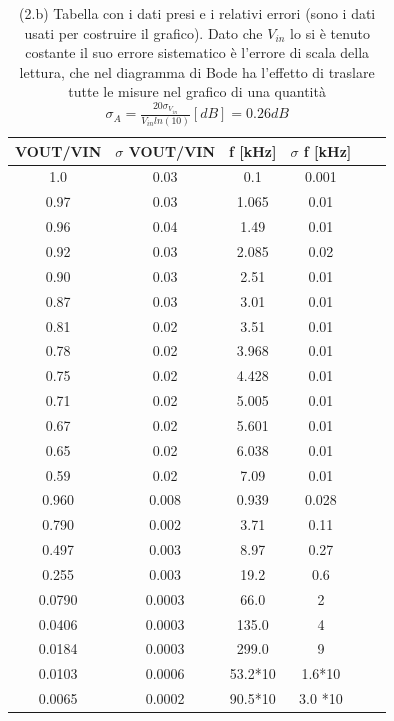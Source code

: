 \documentclass[10pt,a4paper]{article}
\begin{document}
\begin{table}[h]
	\centering
	\begin{tabular}{|c|c|c|c|c|c|}
		\hline 
		 VOUT/VIN & $\sigma$ VOUT/VIN  &f [kHz] & $\sigma$ f [kHz]\\
		\hline 
	1.0 & 0.03 & 0.1 & 0.001\\
	0.97 & 0.03 & 1.065 & 0.01\\
	0.96 & 0.04 & 1.49 & 0.01\\
	0.92 & 0.03 & 2.085 & 0.02\\
	0.90 & 0.03 & 2.51 & 0.01\\
	0.87 & 0.03 & 3.01 & 0.01\\
	0.81 & 0.02 & 3.51 & 0.01\\
	0.78 & 0.02 & 3.968 & 0.01\\
	0.75 & 0.02 & 4.428 & 0.01\\
	0.71 & 0.02 & 5.005 & 0.01\\
	0.67 & 0.02 & 5.601 & 0.01\\
	0.65 & 0.02 & 6.038 & 0.01\\
	0.59 & 0.02 & 7.09 & 0.01\\
	0.960 & 0.008 & 0.939 & 0.028\\
	0.790 & 0.002 & 3.71 & 0.11\\
	0.497 & 0.003 & 8.97 & 0.27\\
	0.255 & 0.003 & 19.2 & 0.6\\
	0.0790 & 0.0003 & 66.0 & 2\\
	0.0406 & 0.0003 & 135.0 & 4\\
	0.0184 & 0.0003 & 299.0 & 9\\
	0.0103 & 0.0006 & 53.2*10 & 1.6*10\\
	0.0065 & 0.0002 & 90.5*10 & 3.0 *10\\
		\hline 
	\end{tabular} 
	\caption{(2.b) Tabella con i dati presi e i relativi errori (sono i dati usati per costruire il grafico). Dato che $V_{in}$ lo si è tenuto costante il suo errore sistematico è l'errore di scala della lettura, che nel diagramma di Bode ha l'effetto di traslare tutte le misure nel grafico di una quantità $\sigma_A=\frac{20 \sigma_{V_{in}}}{V_{in} ln(10)} [dB]=0.26 dB$ \label{t:par1}}
\end{table}
\end{document}
